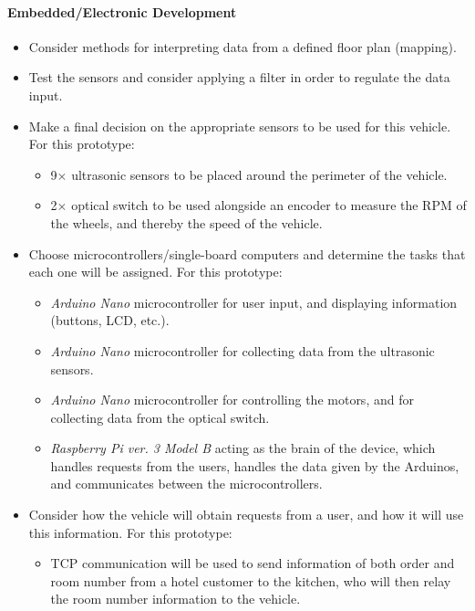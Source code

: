 \documentclass[11pt]{article}
\begin{document}
\paragraph{Embedded/Electronic Development}
\begin{itemize}
\item{Consider methods for interpreting data from a defined floor plan (mapping).}
\item{Test the sensors and consider applying a filter in order to regulate the data input.}
\item{Make a final decision on the appropriate sensors to be used for this vehicle. For this prototype:}
  \begin{itemize}
\item{9$\times$ ultrasonic sensors to be placed around the perimeter of the vehicle.}
\item{2$\times$ optical switch to be used alongside an encoder to measure the RPM of the wheels, and thereby the speed of the vehicle.}
  \end{itemize}
\item{Choose microcontrollers/single-board computers and determine the tasks that each one will be assigned. For this prototype:}
  \begin{itemize}
\item{\textit{Arduino Nano} microcontroller for user input, and displaying information (buttons, LCD, etc.).}
\item{\textit{Arduino Nano} microcontroller for collecting data from the ultrasonic sensors.}
\item{\textit{Arduino Nano} microcontroller for controlling the motors, and for collecting data from the optical switch.}
\item{\textit{Raspberry Pi ver. 3 Model B} acting as the brain of the device, which handles requests from the users, handles the data given by the Arduinos, and communicates between the microcontrollers.}
  \end{itemize}
\item{Consider how the vehicle will obtain requests from a user, and how it will use this information. For this prototype:}
  \begin{itemize}
  \item{TCP communication will be used to send information of both order and room number from a hotel customer to the kitchen, who will then relay the room number information to the vehicle.}
    \end{itemize}
\end{itemize}
\end{document}
